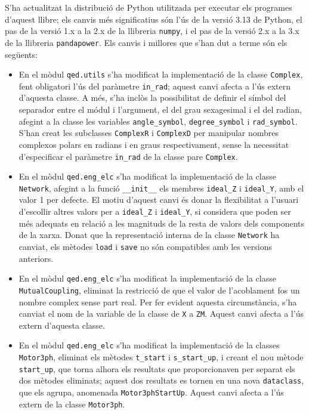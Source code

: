 S'ha actualitzat la distribució de Python utilitzada per executar els programes d'aquest llibre; els canvis més significatius són l'ús de la versió 3.13 de Python, el pas de la versió 1.x a la 2.x de la llibreria \texttt{numpy}, i el pas de la versió 2.x a la 3.x de la llibreria \texttt{pandapower}. Els canvis i millores que s'han dut a terme són els següents:
\begin{itemize}
    \item En el mòdul \texttt{qed.utils} s'ha modificat la implementació  de la classe \texttt{Complex}, fent obligatori l'ús del paràmetre \texttt{in\_rad}; aquest canvi afecta a l'ús extern d'aquesta classe. A més, s'ha inclòs la possibilitat de definir el símbol del separador entre el módul i l'argument,  el del grau sexagesimal i el del radian, afegint a la classe les variables \texttt{angle\_symbol}, \texttt{degree\_symbol} i \texttt{rad\_symbol}.
     S'han creat les subclasses \texttt{ComplexR} i \texttt{ComplexD} per manipular nombres complexos polars en radians i en graus respectivament,  sense la necessitat d'especificar el paràmetre \texttt{in\_rad} de la classe pare \texttt{Complex}.

    \item En el mòdul \texttt{qed.eng\_elc} s'ha modificat la implementació  de la classe \texttt{Network}, afegint a la funció \texttt{\_\_init\_\_} els membres  \texttt{ideal\_Z} i \texttt{ideal\_Y}, amb el valor 1 per defecte. El motiu d'aquest canvi és donar la flexibilitat a l'usuari d'escollir altres valors per a \texttt{ideal\_Z} i \texttt{ideal\_Y}, si considera que poden ser més adequats en relació a les magnituds de la resta de valors  dels components de la xarxa. Donat que la representació interna de la classe \texttt{Network} ha canviat, els mètodes \texttt{load} i  \texttt{save} no són compatibles amb les versions anteriors.

    \item En el mòdul \texttt{qed.eng\_elc} s'ha modificat la implementació  de la classe \texttt{MutualCoupling}, eliminat la restricció de que el valor de l'acoblament fos un nombre complex sense part real.
     Per fer evident aquesta circumstància, s'ha canviat el nom de la variable de la classe de \texttt{X} a  \texttt{ZM}. Aquest canvi afecta a l'ús extern d'aquesta classe.

    \item En el mòdul \texttt{qed.eng\_elc} s'ha modificat la implementació  de la classes \texttt{Motor3ph}, eliminat els mètodes \texttt{t\_start} i \texttt{s\_start\_up}, i creant  el nou mètode \texttt{start\_up}, que torna alhora els resultats que proporcionaven per separat els dos mètodes eliminats;
     aquest dos resultats es tornen en una nova \texttt{dataclass}, que els agrupa, anomenada \texttt{Motor3phStartUp}.
     Aquest canvi afecta a l'ús extern de la classe \texttt{Motor3ph}.


\end{itemize}

